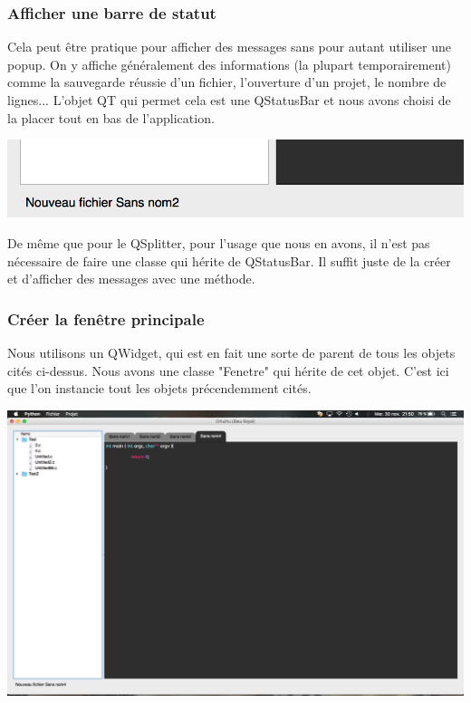 \documentclass[a4paper,12pt]{article}
\begin{document}
			\subsubsection*{Afficher une barre de statut}
			 Cela peut être pratique pour afficher des messages sans pour autant utiliser une popup. On y affiche généralement des informations (la plupart temporairement) comme la sauvegarde réussie d'un fichier, l'ouverture d'un projet, le nombre de lignes... L'objet QT qui permet cela est une QStatusBar et nous avons choisi de la placer tout en bas de l'application.\\
			\begin{center}
				\includegraphics[scale=0.6]{images/QStatusBar}
				\vspace{0.6cm}
			\end{center}
			De même que pour le QSplitter, pour l'usage que nous en avons, il n'est pas nécessaire de faire une classe qui hérite de QStatusBar. Il suffit juste de la créer et d'afficher des messages avec une méthode.\\
			
			
			\subsubsection*{Créer la fenêtre principale}
			Nous utilisons un QWidget, qui est en fait une sorte de parent de tous les objets cités ci-dessus. Nous avons une classe "Fenetre" qui hérite de cet objet. C'est ici que l'on instancie tout les objets précendemment cités.\\
			\begin{center}
				\includegraphics[scale=0.2]{images/QWidget}
				\vspace{0.6cm}
			\end{center}
			
\end{document}
